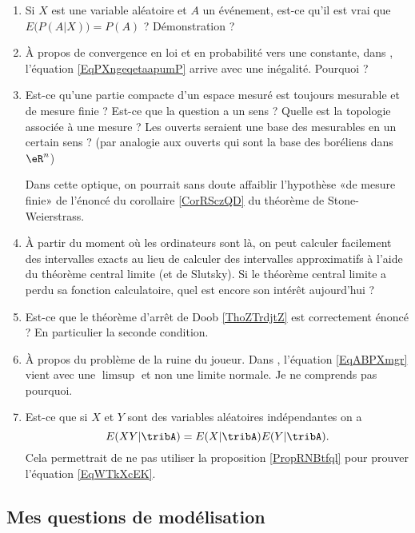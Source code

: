 \begin{enumerate}
    \item
        Si \( X\) est une variable aléatoire et \( A\) un événement, est-ce qu'il est vrai que \( E\big( P(A|X) \big)=P(A)\) ? Démonstration ?
    \item
        À propos de convergence en loi et en probabilité vers une constante, dans \cite{CourgGudRennes}, l'équation \eqref{EqPXngeqetaapumP} arrive avec une inégalité. Pourquoi ?
    \item
        Est-ce qu'une partie compacte d'un espace mesuré est toujours mesurable et de mesure finie ? Est-ce que la question a un sens ? Quelle est la topologie associée à une mesure ? Les ouverts seraient une base des mesurables en un certain sens ?  (par analogie aux ouverts qui sont la base des boréliens dans \( \eR^n\))

        Dans cette optique, on pourrait sans doute affaiblir l'hypothèse «de mesure finie» de l'énoncé du corollaire \ref{CorRSczQD} du théorème de Stone-Weierstrass.
    \item
        À partir du moment où les ordinateurs sont là, on peut calculer facilement des intervalles exacts au lieu de calculer des intervalles approximatifs à l'aide du théorème central limite (et de Slutsky). Si le théorème central limite a perdu sa fonction calculatoire, quel est encore son intérêt aujourd'hui ?
    \item
        Est-ce que le théorème d'arrêt de Doob \ref{ThoZTrdjtZ} est correctement énoncé ? En particulier la seconde condition. 
    \item
        À propos du problème de la ruine du joueur. Dans \cite{KXjFWKA}, l'équation \eqref{EqABPXmgr} vient avec une \( \limsup\) et non une limite normale. Je ne comprends pas pourquoi.
    \item
        Est-ce que si \( X\) et \( Y\) sont des variables aléatoires indépendantes on a
        \begin{equation}
            E(XY|\tribA)=E(X|\tribA)E(Y|\tribA).
        \end{equation}
        Cela permettrait de ne pas utiliser la proposition \ref{PropRNBtfql} pour prouver l'équation \eqref{EqWTkXcEK}.
\end{enumerate}

\subsection{Mes questions de modélisation}

